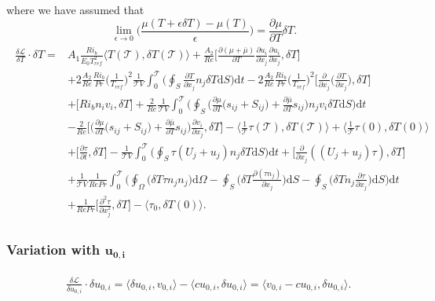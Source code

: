 \documentclass[preprint,12pt]{article}
\begin{document}
where we have assumed that 
\begin{equation}
\lim\limits_{\epsilon\rightarrow 0}\bigg(\frac{\mu(T+\epsilon\delta T)-\mu(T)}{\epsilon}\bigg)=\frac{\partial \mu}{\partial T}\delta T.
\end{equation}
\begin{align}\begin{split}
\frac{\delta \mathcal{L}}{\delta T}\cdot \delta T=&A_1\frac{Ri_b}{E_0T_{ref}^2}\Big\langle T(\mathcal{T}),\delta T(\mathcal{T}) \Big\rangle+\frac{A_2}{Re}\bigg[\frac{\partial (\mu+\overline{\mu})}{\partial T}\frac{\partial u_{i}}{\partial x_j}\frac{\partial u_{i}}{\partial x_j},\delta T\bigg]\\&+2\frac{A_2}{Re}\frac{Ri_b}{Pr}\Big(\frac{1}{T_{ref}}\Big)^2\frac{1}{\mathcal{T}V}\int_0^\mathcal{T}\Big(\oint_S\frac{\partial T}{\partial x_j}  n_j\delta T\text{d}S\Big)\text{d}t-2\frac{A_2}{Re}\frac{Ri_b}{Pr}\Big(\frac{1}{T_{ref}}\Big)^2\bigg[\frac{\partial}{\partial x_j}\Big(\frac{\partial T}{\partial x_j}\Big),\delta T\bigg]\\&+\bigg[Ri_bn_iv_i,\delta T\bigg]+\frac{2}{Re}\frac{1}{\mathcal{T}V}\int_0^\mathcal{T}\Big(\oint_S\Big(\frac{\partial\mu}{\partial T}\big(s_{ij}+S_{ij}\big)+\frac{\partial\bar{\mu}}{\partial T}s_{ij}\Big)  n_j v_i\delta T\text{d}S\Big)\text{d}t\\&-\frac{2}{Re}\Bigg[\Big(\frac{\partial\mu}{\partial T}\big(s_{ij}+S_{ij}\big)+\frac{\partial\bar{\mu}}{\partial T}s_{ij}\Big)\frac{\partial v_i}{\partial x_j}, \delta T\Bigg]-\Big\langle\frac{1}{\mathcal{T}}\tau(\mathcal{T}),\delta T(\mathcal{T}) \Big\rangle+\Big\langle\frac{1}{\mathcal{T}}\tau(0),\delta T(0) \Big\rangle\\&+\bigg[\frac{\partial \tau}{\partial t},\delta T\bigg]-\frac{1}{\mathcal{T}V}\int_0^\mathcal{T}\Big(\oint_S\tau(U_j+u_j)n_j\delta T\text{d}S\Big)\text{d}t+\bigg[\frac{\partial}{\partial x_j}((U_j+u_j)\tau),\delta T\bigg]\\&+\frac{1}{\mathcal{T}V}\frac{1}{RePr}\int_0^\mathcal{T}\Bigg(\oint_\Omega\Big(\delta T \tau n_jn_j\Big) \text{d}\Omega-\oint_S\Big(\delta T\frac{\partial(\tau n_j)}{\partial x_j}\Big) \text{d}S-\oint_S\Big(\delta Tn_j\frac{\partial\tau}{\partial x_j}\Big) \text{d}S\Bigg)\text{d}t\\&+\frac{1}{RePr}\bigg[\frac{\partial^2\tau}{\partial x_j^2},\delta T\bigg]-\langle \tau_0,\delta T(0) \rangle.
\end{split}\end{align}

\subsubsection*{Variation with $\mathbf{u_{0,i}}$}
\begin{align}\label{eq:Adjoint_incompressibility}\begin{split}
&\frac{\delta \mathcal{L}}{\delta u_{0,i}}\cdot \delta u_{0,i}=\langle \delta u_{0,i},v_{0,i}\rangle-\langle cu_{0,i},\delta u_{0,i} \rangle=\langle v_{0,i}-cu_{0,i},\delta u_{0,i}\rangle.
\end{split}\end{align}
\end{document}
